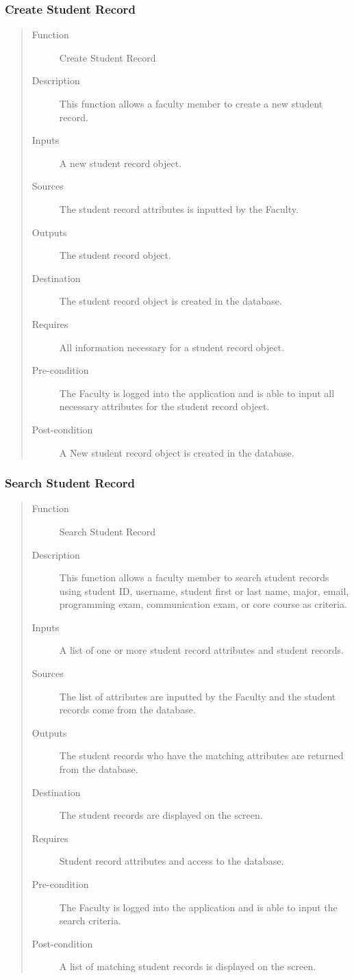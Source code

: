 \subsubsection{Create Student Record} 
\begin{quote} %
\begin{description}
\item[Function]
   Create Student Record
\item[Description]
   This function allows a faculty member to create a new student record.
\item[Inputs]
   A new student record object.
\item[Sources]
   The student record attributes is inputted by the Faculty.
\item[Outputs]
   The student record object.
\item[Destination]
   The student record object is created in the database.
\item[Requires]
   All information necessary for a student record object.
\item[Pre-condition]
   The Faculty is logged into the application and is able to input all necessary
   attributes for the student record object.
\item[Post-condition]
   A New student record object is created in the database.
\end{description}
\end{quote} %

\subsubsection{Search Student Record} 
\begin{quote} %
\begin{description}
\item[Function]
   Search Student Record
\item[Description]
   This function allows a faculty member to search student records using
   student ID, username, student first or last name, major, email, programming
   exam, communication exam, or core course as criteria.
\item[Inputs]
   A list of one or more student record attributes and student records.
\item[Sources]
   The list of attributes are inputted by the Faculty and the student records
   come from the database.
\item[Outputs]
   The student records who have the matching attributes are returned from the
   database.
\item[Destination]
   The student records are displayed on the screen.
\item[Requires]
   Student record attributes and access to the database.
\item[Pre-condition]
   The Faculty is logged into the application and is able to input the search
   criteria.
\item[Post-condition]
   A list of matching student records is displayed on the screen.
\end{description}
\end{quote} %


